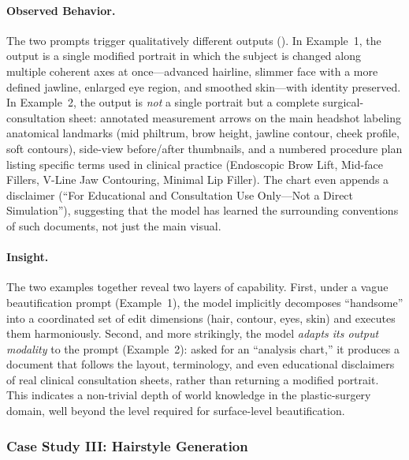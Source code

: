 \documentclass{llmxive}
\begin{document}
\paragraph{Observed Behavior.}
The two prompts trigger qualitatively different outputs (). In Example~1, the output is a single modified portrait in which the subject is changed along multiple coherent axes at once---advanced hairline, slimmer face with a more defined jawline, enlarged eye region, and smoothed skin---with identity preserved. In Example~2, the output is \emph{not} a single portrait but a complete surgical-consultation sheet: annotated measurement arrows on the main headshot labeling anatomical landmarks (mid philtrum, brow height, jawline contour, cheek profile, soft contours), side-view before/after thumbnails, and a numbered procedure plan listing specific terms used in clinical practice (Endoscopic Brow Lift, Mid-face Fillers, V-Line Jaw Contouring, Minimal Lip Filler). The chart even appends a disclaimer (``For Educational and Consultation Use Only---Not a Direct Simulation''), suggesting that the model has learned the surrounding conventions of such documents, not just the main visual.

\paragraph{Insight.}
The two examples together reveal two layers of capability. First, under a vague beautification prompt (Example~1), the model implicitly decomposes ``handsome'' into a coordinated set of edit dimensions (hair, contour, eyes, skin) and executes them harmoniously. Second, and more strikingly, the model \emph{adapts its output modality} to the prompt (Example~2): asked for an ``analysis chart,'' it produces a document that follows the layout, terminology, and even educational disclaimers of real clinical consultation sheets, rather than returning a modified portrait. This indicates a non-trivial depth of world knowledge in the plastic-surgery domain, well beyond the level required for surface-level beautification.



\subsubsection{Case Study III: Hairstyle Generation}
\end{document}
